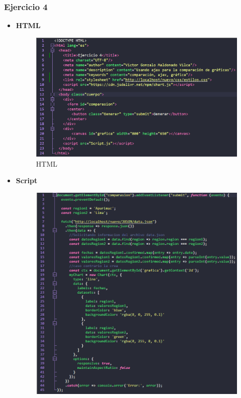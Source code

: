 \documentclass{article}
\begin{document}
    \subsubsection{Ejercicio 4}
	\begin{itemize}
		\item \textbf{HTML}
		\begin{figure}[H]
			\centering
			\includegraphics[width=1\textwidth,keepaspectratio]{img/html4.png}
			\caption{HTML}
		\end{figure}
		\newpage
		\item \textbf{Script}
		\begin{figure}[H]
			\centering
			\includegraphics[width=1\textwidth,keepaspectratio]{img/Script4.png}

\end{figure}
\end{itemize}
\end{document}
